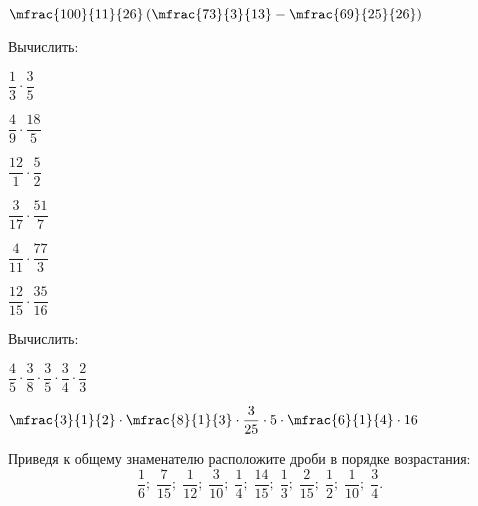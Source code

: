 \begin{class}[number=4]
\begin{listofex}
\begin{enumcols}[itemcolumns=2]
			\item \( \mfrac{100}{11}{26}\left( \mfrac{73}{3}{13}-\mfrac{69}{25}{26} \right) \)
		\end{enumcols}
		\item Вычислить:
		\begin{enumcols}[columns=6]
			\item \( \dfrac{1}{3}\cdot\dfrac{3}{5} \)
			\item \( \dfrac{4}{9}\cdot\dfrac{18}{5} \)
			\item \( \dfrac{12}{1}\cdot\dfrac{5}{2} \)
			\item \( \dfrac{3}{17}\cdot\dfrac{51}{7} \)
			\item \( \dfrac{4}{11}\cdot\dfrac{77}{3} \)
			\item \( \dfrac{12}{15}\cdot\dfrac{35}{16} \)
		\end{enumcols}
		\item Вычислить:
		\begin{enumcols}[columns=2]
			\item \( \dfrac{4}{5}\cdot\dfrac{3}{8}\cdot\dfrac{3}{5}\cdot\dfrac{3}{4}\cdot\dfrac{2}{3} \)
			\item \( \mfrac{3}{1}{2}\cdot\mfrac{8}{1}{3}\cdot\dfrac{3}{25}\cdot5\cdot\mfrac{6}{1}{4}\cdot16 \)
		\end{enumcols}
	\end{listofex}
\end{class}
\begin{homework}[number=2]
	\begin{listofex}
		\item Приведя к общему знаменателю расположите дроби в порядке возрастания:
		\[ \dfrac{1}{6};\;\dfrac{7}{15};\;\dfrac{1}{12};\;\dfrac{3}{10};\;\dfrac{1}{4};\;\dfrac{14}{15};\;\dfrac{1}{3};\;\dfrac{2}{15};\;\dfrac{1}{2};\;\dfrac{1}{10};\;\dfrac{3}{4}. \]
	\end{listofex}
\end{homework}
%	
%	
%	
%	
